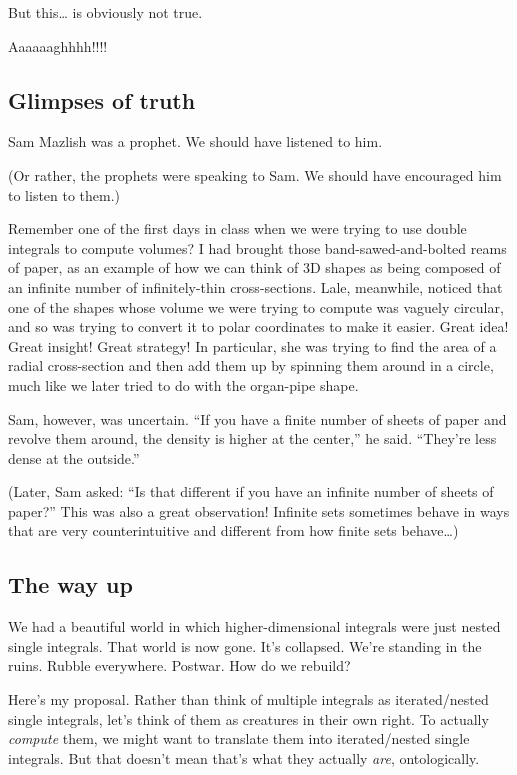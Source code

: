 \documentclass[
]{article}
\begin{document}
But this\ldots{} is obviously not true.

Aaaaaaghhhh!!!!

\hypertarget{glimpses-of-truth}{%
\subsection{Glimpses of truth}\label{glimpses-of-truth}}

Sam Mazlish was a prophet. We should have listened to him.

(Or rather, the prophets were speaking to Sam. We should have encouraged him to listen to them.)

Remember one of the first days in class when we were trying to use double integrals to compute volumes? I had brought those band-sawed-and-bolted reams of paper, as an example of how we can think of 3D shapes as being composed of an infinite number of infinitely-thin cross-sections. Lale, meanwhile, noticed that one of the shapes whose volume we were trying to compute was vaguely circular, and so was trying to convert it to polar coordinates to make it easier. Great idea! Great insight! Great strategy! In particular, she was trying to find the area of a radial cross-section and then add them up by spinning them around in a circle, much like we later tried to do with the organ-pipe shape.

Sam, however, was uncertain. ``If you have a finite number of sheets of paper and revolve them around, the density is higher at the center,'' he said. ``They're less dense at the outside.''

(Later, Sam asked: ``Is that different if you have an infinite number of sheets of paper?'' This was also a great observation! Infinite sets sometimes behave in ways that are very counterintuitive and different from how finite sets behave\ldots)

\hypertarget{the-way-up}{%
\subsection{The way up}\label{the-way-up}}

We had a beautiful world in which higher-dimensional integrals were just nested single integrals. That world is now gone. It's collapsed. We're standing in the ruins. Rubble everywhere. Postwar. How do we rebuild?

Here's my proposal. Rather than think of multiple integrals as iterated/nested single integrals, let's think of them as creatures in their own right. To actually \emph{compute} them, we might want to translate them into iterated/nested single integrals. But that doesn't mean that's what they actually \emph{are}, ontologically.
\end{document}
